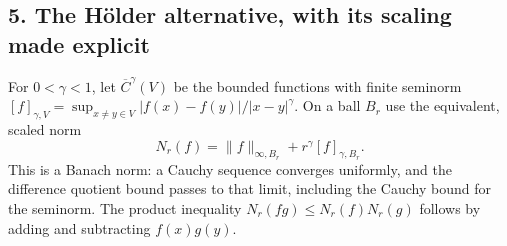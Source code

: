 \documentclass[
  11pt,
]{article}
\makeatletter
\let\ReaderOriginalAnchorStart\hyper@anchorstart
\let\ReaderOriginalAnchorEnd\hyper@anchorend
\let\ReaderPendingAliases\@empty
\def\ReaderArmAliases#1{\gdef\ReaderPendingAliases{#1}}
\def\hyper@anchorstart#1{\ReaderIfNativeAnchorTF{#1}{\ReaderPendingAliases\global\let\ReaderPendingAliases\@empty}{}\ReaderOriginalAnchorStart{#1}}
\makeatother
\begin{document}
\ReaderArmAliases{\ReaderOriginalAnchorStart{AN03-LCE-005}\ReaderOriginalAnchorEnd\begingroup\expandafter\def\csname @currentHref\endcsname{AN03-LCE-005}\label{AN03-LCE-005}\endgroup\ReaderOriginalAnchorStart{an03-lce-005-the-holder-alternative-with-its-scaling-made-explicit}\ReaderOriginalAnchorEnd\begingroup\expandafter\def\csname @currentHref\endcsname{an03-lce-005-the-holder-alternative-with-its-scaling-made-explicit}\label{an03-lce-005-the-holder-alternative-with-its-scaling-made-explicit}\endgroup\ReaderOriginalAnchorStart{5-the-holder-alternative-with-its-scaling-made-explicit}\ReaderOriginalAnchorEnd\begingroup\expandafter\def\csname @currentHref\endcsname{5-the-holder-alternative-with-its-scaling-made-explicit}\label{5-the-holder-alternative-with-its-scaling-made-explicit}\endgroup\pdfextension dest name{\string\376\string\377\string\000\string\164\string\000\string\150\string\000\string\145\string\000\string\055\string\000\string\150\string\000\string\366\string\000\string\154\string\000\string\144\string\000\string\145\string\000\string\162\string\000\string\055\string\000\string\141\string\000\string\154\string\000\string\164\string\000\string\145\string\000\string\162\string\000\string\156\string\000\string\141\string\000\string\164\string\000\string\151\string\000\string\166\string\000\string\145\string\000\string\055\string\000\string\167\string\000\string\151\string\000\string\164\string\000\string\150\string\000\string\055\string\000\string\151\string\000\string\164\string\000\string\163\string\000\string\055\string\000\string\163\string\000\string\143\string\000\string\141\string\000\string\154\string\000\string\151\string\000\string\156\string\000\string\147\string\000\string\055\string\000\string\155\string\000\string\141\string\000\string\144\string\000\string\145\string\000\string\055\string\000\string\145\string\000\string\170\string\000\string\160\string\000\string\154\string\000\string\151\string\000\string\143\string\000\string\151\string\000\string\164} xyz\relax\begingroup\expandafter\def\csname @currentHref\endcsname{the-hölder-alternative-with-its-scaling-made-explicit}\label{the-hölder-alternative-with-its-scaling-made-explicit}\endgroup}
\subsection{5. The Hölder alternative, with its scaling made
explicit}\label{the-huxf6lder-alternative-with-its-scaling-made-explicit}

For \(0<\gamma<1\), let \(\overline C^\gamma(V)\) be the bounded
functions with finite seminorm
\([f]_{\gamma,V}=\sup_{x\ne y\in V}|f(x)-f(y)|/|x-y|^\gamma\). On a ball
\(B_r\) use the equivalent, scaled norm \[
N_r(f)=\|f\|_{\infty,B_r}+r^\gamma[f]_{\gamma,B_r}.                 \tag{L21}
\] This is a Banach norm: a Cauchy sequence converges uniformly, and the
difference quotient bound passes to that limit, including the Cauchy
bound for the seminorm. The product inequality
\(N_r(fg)\leq N_r(f)N_r(g)\) follows by adding and subtracting
\(f(x)g(y)\).
\end{document}

